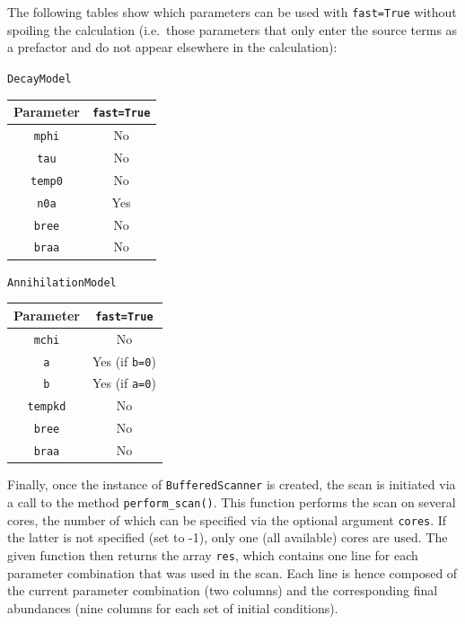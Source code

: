 \documentclass[11pt,a4paper]{article}
\begin{document}
The following tables show which parameters can be used with \texttt{fast=True} without spoiling the calculation (i.e.\ those parameters that only enter the source terms as a prefactor and do not appear elsewhere in the calculation):
\begin{center}
\begin{minipage}{0.495\textwidth}
\centering
\texttt{DecayModel}\\
\begin{tabular}{|c|c|}
	\hline
	Parameter & \texttt{fast=True} \\
	\hline \hline
	\texttt{mphi} & No \\
	\hline
	\texttt{tau} & No \\
	\hline
	\texttt{temp0} & No \\
	\hline
	\texttt{n0a} & Yes \\
	\hline
	\texttt{bree} & No \\
	\hline
	\texttt{braa} & No \\
	\hline
\end{tabular}
\end{minipage}
\begin{minipage}{0.495\textwidth}
\centering
\texttt{AnnihilationModel}\vspace{2.5pt}\\
\begin{tabular}{|c|c|}
	\hline
	Parameter & \texttt{fast=True} \\
	\hline\hline
	\texttt{mchi} & No \\
	\hline
	\texttt{a} & Yes (if \texttt{b=0})  \\
	\hline
	\texttt{b} & Yes (if \texttt{a=0}) \\
	\hline
	\texttt{tempkd} & No \\
	\hline
	\texttt{bree} & No \\
	\hline
	\texttt{braa} & No \\
	\hline
\end{tabular}
\end{minipage}
\end{center}
\vspace{4mm}

Finally, once the instance of \texttt{BufferedScanner} is created, the scan is initiated via a call to the method \texttt{perform\_scan()}. This function performs the scan on several cores, the number of which can be specified via the optional argument \texttt{cores}. If the latter is not specified (set to -1), only one (all available) cores are used. The given function then returns the array \texttt{res}, which contains one line for each parameter combination that was used in the scan. Each line is hence composed of the current parameter combination (two columns) and the corresponding final abundances (nine columns for each set of initial conditions).
\end{document}
